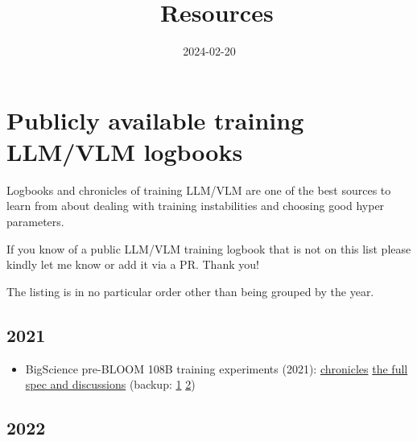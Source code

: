 \documentclass[
]{report}
\title{📓 Resources}
\author{}
\date{2024-02-20}
\providecommand{\tightlist}{%
  \setlength{\itemsep}{0pt}\setlength{\parskip}{0pt}}\usepackage{longtable,booktabs,array}
\begin{document}
\maketitle

\section{Publicly available training LLM/VLM
logbooks}\label{publicly-available-training-llmvlm-logbooks}

Logbooks and chronicles of training LLM/VLM are one of the best sources
to learn from about dealing with training instabilities and choosing
good hyper parameters.

If you know of a public LLM/VLM training logbook that is not on this
list please kindly let me know or add it via a PR. Thank you!

The listing is in no particular order other than being grouped by the
year.

\subsection{2021}\label{section}

\begin{itemize}
\tightlist
\item
  BigScience pre-BLOOM 108B training experiments (2021):
  \href{https://github.com/bigscience-workshop/bigscience/blob/master/train/tr8-104B-wide/chronicles.md}{chronicles}
  \textbar{}
  \href{https://github.com/bigscience-workshop/bigscience/blob/master/train/tr8-104B-wide}{the
  full spec and discussions} (backup:
  \href{https://github.com/stas00/bigscience-backup/blob/master/train/tr8-104B-wide/chronicles.md}{1}
  \textbar{}
  \href{https://github.com/stas00/bigscience-backup/blob/master/train/tr8-104B-wide}{2})
\end{itemize}

\subsection{2022}\label{section-1}
\end{document}

